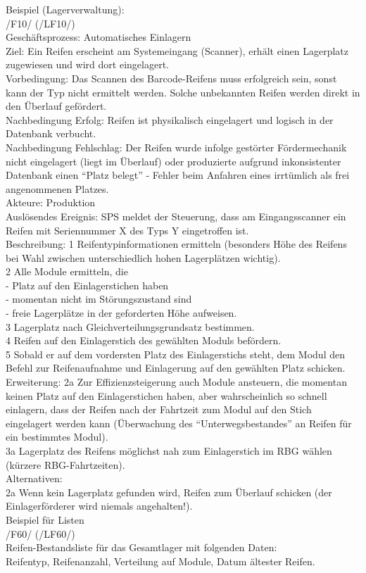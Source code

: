 Beispiel (Lagerverwaltung):\\
/F10/ (/LF10/)\\
Geschäftsprozess: Automatisches Einlagern\\
Ziel: Ein Reifen erscheint am Systemeingang (Scanner), erhält einen Lagerplatz
zugewiesen und wird dort eingelagert.\\
Vorbedingung: Das Scannen des Barcode-Reifens muss erfolgreich sein, sonst kann
der Typ nicht ermittelt werden. Solche unbekannten Reifen werden direkt in den
Überlauf gefördert.\\
Nachbedingung Erfolg: Reifen ist physikalisch eingelagert und logisch in der
Datenbank verbucht.\\
Nachbedingung Fehlschlag: Der Reifen wurde infolge gestörter Fördermechanik
nicht eingelagert (liegt im Überlauf) oder produzierte aufgrund inkonsistenter
Datenbank einen "`Platz belegt"' - Fehler beim Anfahren eines irrtümlich
als frei angenommenen Platzes.\\
Akteure: Produktion\\
Auslösendes Ereignis: SPS meldet der Steuerung, dass am Eingangsscanner ein
Reifen mit Seriennummer X des Typs Y eingetroffen ist.
\\Beschreibung:
1 Reifentypinformationen ermitteln (besonders Höhe des Reifens bei Wahl
zwischen unterschiedlich hohen Lagerplätzen wichtig).\\
2 Alle Module ermitteln, die\\
-  Platz auf den Einlagerstichen haben\\
-  momentan nicht im Störungszustand sind\\
-  freie Lagerplätze in der geforderten Höhe aufweisen.\\
3 Lagerplatz nach Gleichverteilungsgrundsatz bestimmen.\\
4 Reifen auf den Einlagerstich des gewählten Moduls befördern.\\
5 Sobald er auf dem vordersten Platz des Einlagerstichs steht, dem Modul den
Befehl zur Reifenaufnahme und Einlagerung auf den gewählten Platz schicken.
\\Erweiterung:
2a Zur Effizienzsteigerung auch Module ansteuern, die momentan keinen Platz auf
den Einlagerstichen haben, aber wahrscheinlich so schnell einlagern, dass der
Reifen nach der Fahrtzeit zum Modul auf den Stich eingelagert werden kann
(Überwachung des "`Unterwegsbestandes"' an Reifen für ein bestimmtes
Modul).\\
3a Lagerplatz des Reifens möglichst nah zum Einlagerstich im RBG wählen
(kürzere RBG-Fahrtzeiten).\\
Alternativen:\\
2a Wenn kein Lagerplatz gefunden wird, Reifen zum Überlauf schicken (der
Einlagerförderer wird niemals angehalten!).\\
\newpage
Beispiel für Listen\\
/F60/ (/LF60/)\\
Reifen-Bestandsliste für das Gesamtlager mit folgenden Daten:\\
Reifentyp, Reifenanzahl, Verteilung auf Module, Datum ältester Reifen.\\

